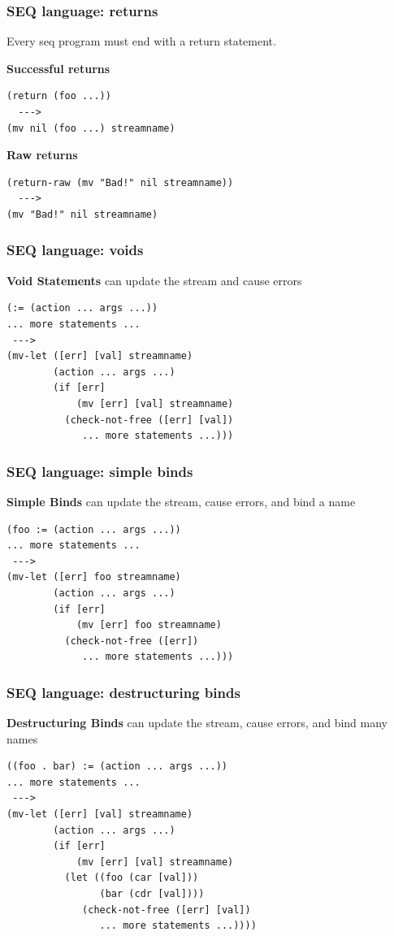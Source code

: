 \documentclass{beamer}
\newcommand{\SmallSkip}{\vspace{0.5cm}\noindent}
\begin{document}
\begin{frame}[fragile]
\frametitle{SEQ language: returns}

Every seq program must end with a return statement.

\SmallSkip

{\bf Successful returns}

\begin{verbatim}
(return (foo ...))
  --->
(mv nil (foo ...) streamname)
\end{verbatim}

{\bf Raw returns}

\begin{verbatim}
(return-raw (mv "Bad!" nil streamname))
  --->
(mv "Bad!" nil streamname)
\end{verbatim}
\end{frame}


\begin{frame}[fragile]
\frametitle{SEQ language: voids}
{\bf Void Statements} can update the stream and cause errors

\SmallSkip
\begin{verbatim}
(:= (action ... args ...))
... more statements ...
 --->
(mv-let ([err] [val] streamname)
        (action ... args ...)
        (if [err]
            (mv [err] [val] streamname)
          (check-not-free ([err] [val])
             ... more statements ...)))
\end{verbatim}
\end{frame}


\begin{frame}[fragile]
\frametitle{SEQ language: simple binds}
{\bf Simple Binds} can update the stream, cause errors, and bind a name

\SmallSkip
\begin{verbatim}
(foo := (action ... args ...))
... more statements ...
 --->
(mv-let ([err] foo streamname)
        (action ... args ...)
        (if [err]
            (mv [err] foo streamname)
          (check-not-free ([err])
             ... more statements ...)))
\end{verbatim}
\end{frame}



\begin{frame}[fragile]
\frametitle{SEQ language: destructuring binds}
{\bf Destructuring Binds} can update the stream, cause errors, and bind many names

\SmallSkip
\begin{verbatim}
((foo . bar) := (action ... args ...))
... more statements ...
 --->
(mv-let ([err] [val] streamname)
        (action ... args ...)
        (if [err]
            (mv [err] [val] streamname)
          (let ((foo (car [val]))
                (bar (cdr [val])))
             (check-not-free ([err] [val])
                ... more statements ...))))
\end{verbatim}
\end{frame}
\end{document}
